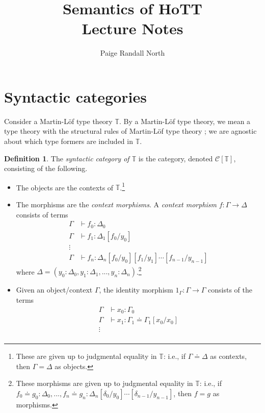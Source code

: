 \documentclass{article}
\title{Semantics of HoTT \\ Lecture Notes}
\author{Paige Randall North}
\theoremstyle{definition}
\newtheorem{definition}{Definition}[section]
\newcommand{\T}{\mathbb T}
\newcommand{\C}{\mathcal C}
\newcommand{\syncat}[1]{\C [#1]}
\newcommand{\seq}{\doteq}
\begin{document}
\maketitle

\tableofcontents

\section{Syntactic categories}

Consider a Martin-Löf type theory $\T$. By a Martin-Löf type theory, we mean a type theory with the structural rules of Martin-Löf type theory \cite{hofmann}; we are agnostic about which type formers are included in $\T$.

\begin{definition}
    The \emph{syntactic category of $\T$} is the category, denoted $\syncat{\T}$, consisting of the following.
    \begin{itemize}
        \item The objects are the contexts of $\T$.\footnote{These are given up to judgmental equality in $\T$: i.e., if $\Gamma \seq \Delta$ as contexts, then $\Gamma = \Delta$ as objects.}
        \item The morphisms are the \emph{context morphisms}. A \emph{context morphism} $f : \Gamma \to \Delta$ consists of terms
        \begin{align*}
            \Gamma &\vdash f_0 : \Delta_0 \\
            \Gamma &\vdash f_1 : \Delta_1[f_0 / y_0] \\
            \vdots \\
            \Gamma &\vdash f_n : \Delta_n [f_0 / y_0] [f_1 / y_1] \cdots [f_{n-1} / y_{n-1}]
        \end{align*}
        where $\Delta = (y_0 : \Delta_0 , y_1 : \Delta_1, ... , y_n : \Delta_n)$.\footnote{These morphisms are given up to judgmental equality in $\T$: i.e., if $f_0 \seq g_0 : \Delta_0, ..., f_n \seq g_n : \Delta_n [\delta_0 / y_0] \cdots [\delta_{n-1} / y_{n-1}]$, then $f = g$ as morphisms.}
        \item Given an object/context $\Gamma$, the identity morphism $1_\Gamma : \Gamma \to \Gamma$ consists of the terms
        \begin{align*}
            \Gamma &\vdash x_0 : \Gamma_0 \\
            \Gamma &\vdash x_1 : \Gamma_1 \seq \Gamma_1[x_0 / x_0] \\
            \vdots \\

\end{align*}
\end{itemize}
\end{definition}
\end{document}
